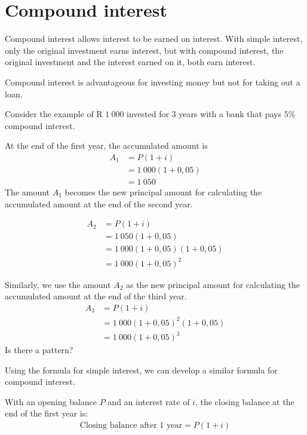\section{Compound interest}

Compound interest allows interest to be earned on interest. With simple interest, only the original investment earns interest, but with compound interest, the original investment and the interest earned on it, both earn interest.\par

Compound interest is advantageous for investing money but not for taking out a loan.


Consider the example of R $1~000$ invested for 3 years with a bank that pays $5\%$ compound interest.\par 

At the end of the first year, the accumulated amount is 
\begin{align*}
    A_1 &= P(1 + i)\\
&= 1~000(1+0,05)\\
&=1~050
\end{align*}
The amount $A_1$ becomes the new principal amount for calculating the accumulated amount at the end of the second year.

\begin{align*}
    A_2 &= P(1 + i)\\
&= 1~050(1+0,05)\\
&=1~000(1+0,05)(1+0,05)\\
&= 1~000(1+0,05)^2
\end{align*}

Similarly, we use the amount $A_2$ as the new principal amount for calculating the accumulated amount at the end of the third year.
\begin{align*}
    A_3 &= P(1 + i)\\
&=1~000(1+0,05)^2(1+0,05)\\
&= 1~000(1+0,05)^3
\end{align*}
Is there a pattern?\par
Using the formula for simple interest, we can develop a similar formula for compound interest.\par

With an opening balance $P$ and an interest rate of $i$, the closing balance at the end of the first year is:
\begin{eqnarray*}
    \text{Closing balance after 1 year} = P(1 + i)
\end{eqnarray*}

